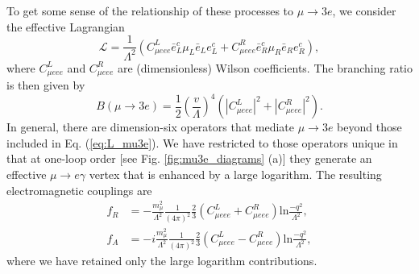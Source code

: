 \documentclass[12pt,letterpaper]{book}
\begin{document}
To get some sense of the relationship of these processes to $\mu\rightarrow 3e$, we consider the effective Lagrangian
\begin{equation}
\mathcal{L}=\frac{1}{\Lambda^2}\left(C_{\mu eee}^L\bar{e}^c_L\mu_L\bar{e}_Le^c_L+C^R_{\mu eee}\bar{e}^c_R\mu_R\bar{e}_Re^c_R\right),
\label{eq:L_mu3e}
\end{equation}
where $C^L_{\mu eee}$ and $C^R_{\mu eee}$ are (dimensionless) Wilson coefficients. The branching ratio is then given by
\begin{equation}
B(\mu\rightarrow 3e)=\frac{1}{2}\left(\frac{v}{\Lambda}\right)^4\left(|C^L_{\mu eee}|^2+|C^R_{\mu eee}|^2\right).
\end{equation}
In general, there are dimension-six operators that mediate $\mu\rightarrow 3e$ beyond those included in Eq. (\ref{eq:L_mu3e}). We have restricted to those operators unique in that at one-loop order [see Fig. \ref{fig:mu3e_diagrams} (a)] they generate an effective $\mu\rightarrow e\gamma$ vertex that is enhanced by a large logarithm. The resulting electromagnetic couplings are \cite{Raidal:1997hq,Cirigliano:2004mv,PhysRevLett.93.231802}
\begin{equation}
\begin{split}
f_R&=-\frac{m_{\mu}^2}{\Lambda^2}\frac{1}{(4\pi)^2}\frac{2}{3}\left(C^L_{\mu eee}+C^R_{\mu eee}\right)\mathrm{ln}\frac{-q^2}{\Lambda^2},\\
f_A&=-i\frac{m_{\mu}^2}{\Lambda^2}\frac{1}{(4\pi)^2}\frac{2}{3}\left(C^L_{\mu eee}-C^R_{\mu eee}\right)\mathrm{ln}\frac{-q^2}{\Lambda^2},
\end{split}
\end{equation}
where we have retained only the large logarithm contributions.
\end{document}

